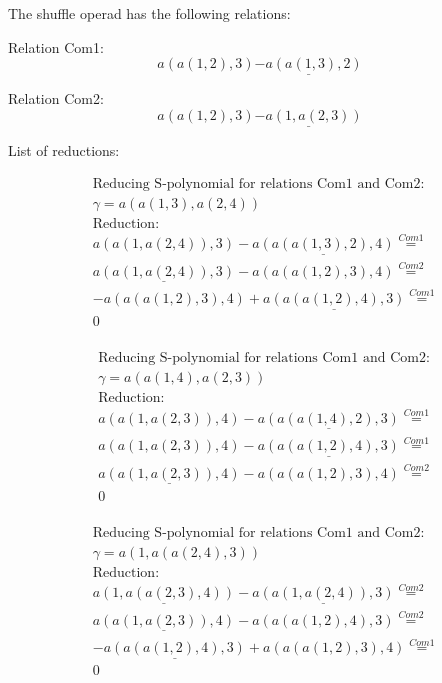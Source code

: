 \documentclass[11pt]{amsart}
\begin{document}
 
 
The shuffle operad has the following relations: 

 Relation Com1: 
 $$ 
a(a(1,2),3)\underline{ - a(a(1,3),2)}
 $$ 

 Relation Com2: 
 $$ 
a(a(1,2),3)\underline{ - a(1,a(2,3))}
 $$ 

 
 
 List of reductions: 
 
\begin{align*} 
& \text{Reducing S-polynomial for relations Com1 and Com2:} \\ 
& \gamma = a(a(1,3),a(2,4)) \\ 
& \text{Reduction}: \\&a(a(1,a(2,4)),3) - \underline{a(a(a(1,3),2),4)} \stackrel{ Com1 }{=}  \\ 
&\underline{a(a(1,a(2,4)),3)} - a(a(a(1,2),3),4) \stackrel{ Com2 }{=}  \\ 
& - a(a(a(1,2),3),4) + \underline{a(a(a(1,2),4),3)} \stackrel{ Com1 }{=}  \\ 
&0\\ 
\end{align*} 
 
\begin{align*} 
& \text{Reducing S-polynomial for relations Com1 and Com2:} \\ 
& \gamma = a(a(1,4),a(2,3)) \\ 
& \text{Reduction}: \\&a(a(1,a(2,3)),4) - \underline{a(a(a(1,4),2),3)} \stackrel{ Com1 }{=}  \\ 
&a(a(1,a(2,3)),4) - \underline{a(a(a(1,2),4),3)} \stackrel{ Com1 }{=}  \\ 
&\underline{a(a(1,a(2,3)),4)} - a(a(a(1,2),3),4) \stackrel{ Com2 }{=}  \\ 
&0\\ 
\end{align*} 
 
\begin{align*} 
& \text{Reducing S-polynomial for relations Com1 and Com2:} \\ 
& \gamma = a(1,a(a(2,4),3)) \\ 
& \text{Reduction}: \\&\underline{a(1,a(a(2,3),4))} - \underline{a(a(1,a(2,4)),3)} \stackrel{ Com2 }{=}  \\ 
&\underline{a(a(1,a(2,3)),4)} - a(a(a(1,2),4),3) \stackrel{ Com2 }{=}  \\ 
& - \underline{a(a(a(1,2),4),3)} + a(a(a(1,2),3),4) \stackrel{ Com1 }{=}  \\ 
&0\\ 
\end{align*} 
 
\end{document}
